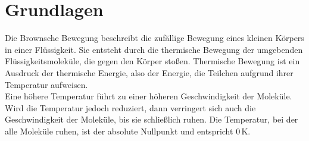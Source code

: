 \section*{Grundlagen}

Die Brownsche Bewegung beschreibt die zufällige Bewegung eines kleinen Körpers in einer Flüssigkeit. Sie entsteht durch die thermische Bewegung der umgebenden Flüssigkeitsmoleküle, die gegen den Körper stoßen.
Thermische Bewegung ist ein Ausdruck der thermische Energie, also der Energie, die Teilchen aufgrund ihrer Temperatur aufweisen.\\
Eine höhere Temperatur führt zu einer höheren Geschwindigkeit der Moleküle. Wird die Temperatur jedoch reduziert, dann verringert sich auch die Geschwindigkeit der Moleküle, bis sie schließlich ruhen. Die Temperatur, bei der alle Moleküle ruhen, ist der absolute Nullpunkt und entspricht $0 \,$K.\\

